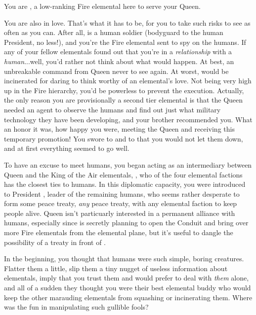 \documentclass[char]{elementals}
\begin{document}
\name{\cJuliet{}}

You are \cJuliet{\intro}, a low-ranking Fire elemental here to serve your Queen.

You are also in love.  That's what it has to be, for you to take such risks to see \cRomeo{\intro} as often as you can.  After all, \cRomeo{\they} is a human soldier (bodyguard to the human President, no less!), and you're the Fire elemental sent to spy on the humans.  If any of your fellow elementals found out that you're in a \emph{relationship} with a \emph{human}...well, you'd rather not think about what would happen.  At best, an unbreakable command from Queen \cQueen{\intro} never to see \cRomeo{} again.  At worst, \cRomeo{\they} would be incinerated for daring to think \cRomeo{\themself} worthy of an elemental's love.  Not being very high up in the Fire hierarchy, you'd be powerless to prevent the execution.  Actually, the only reason you are provisionally a second tier elemental is that the Queen needed an agent to observe the humans and find out just what military technology they have been developing, and your brother \cPyro{\intro} recommended you.  What an honor it was, how happy you were, meeting the Queen and receiving this temporary promotion!  You swore to \cQueen{\them} and to \cPyro{} that you would not let them down, and at first everything seemed to go well.

To have an excuse to meet humans, you began acting as an intermediary between Queen \cQueen{} and the King of the Air elementals, \cKing{\intro}, who of the four elemental factions has the closest ties to humans.  In this diplomatic capacity, you were introduced to President \cLeader{\intro}, leader of the remaining humans, who seems rather desperate to form some peace treaty, \emph{any} peace treaty, with any elemental faction to keep \cLeader{\their} people alive.  Queen \cQueen{} isn't particuarly interested in a permanent alliance with humans, especially since \cQueen{\they} is secretly planning to open the Conduit and bring over more Fire elementals from the elemental plane, but it's useful to dangle the possibility of a treaty in front of \cLeader{}.  

In the beginning, you thought that humans were such simple, boring creatures.  Flatter them a little, slip them a tiny nugget of useless information about elementals, imply that you trust them and would prefer to deal with \emph{them} alone, and all of a sudden they thought you were their best elemental buddy who would keep the other marauding elementals from squashing or incinerating them.  Where was the fun in manipulating such gullible fools?
\end{document}
